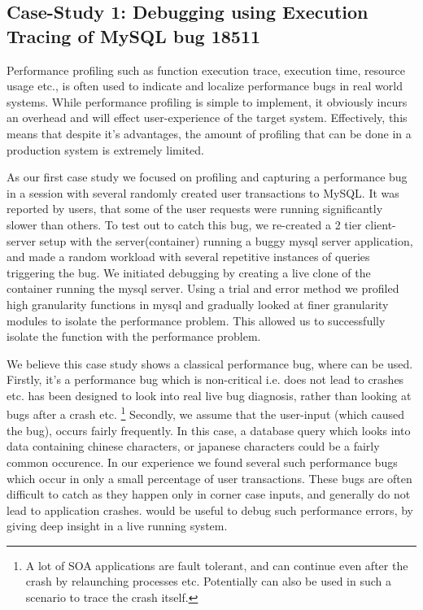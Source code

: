\subsection{Case-Study 1: Debugging using Execution Tracing of MySQL bug 18511}  
Performance profiling such as function execution trace, execution time, resource usage etc., is often used to indicate and localize performance bugs in real world systems. 
While performance profiling is simple to implement, it obviously incurs an overhead and will effect user-experience of the target system.
Effectively, this means that despite it's advantages, the amount of profiling that can be done in a production system is extremely limited. 

As our first case study we focused on profiling and capturing a performance bug in a session with several randomly created user transactions to MySQL. 
It was reported by users, that some of the user requests were running significantly slower than others.
To test out \parikshan to catch this bug, we re-created a 2 tier client-server setup with the server(container) running a buggy mysql server application, and made a random workload with several repetitive instances of queries triggering the bug.
We initiated debugging by creating a live clone of the container running the mysql server.
Using a trial and error method we profiled high granularity functions in mysql and gradually looked at finer granularity modules to isolate the performance problem.
This allowed us to successfully isolate the function with the performance problem.

We believe this case study shows a classical performance bug, where \parikshan can be used.
Firstly, it's a performance bug which is non-critical i.e. does not lead to crashes etc.
\parikshan has been designed to look into real live bug diagnosis, rather than looking at bugs after a crash etc.
\footnote{A lot of SOA applications are fault tolerant, and can continue even after the crash by relaunching processes etc. Potentially \parikshan can also be used in such a scenario to trace the crash itself.}
Secondly, we assume that the user-input (which caused the bug), occurs fairly frequently.
In this case, a database query which looks into data containing chinese characters, or japanese characters could be a fairly common occurence.
In our experience we found several such performance bugs which occur in only a small percentage of user transactions.
These bugs are often difficult to catch as they happen only in corner case inputs, and generally do not lead to application crashes.
\parikshan would be useful to debug such performance errors, by giving deep insight in a live running system.
\fi

